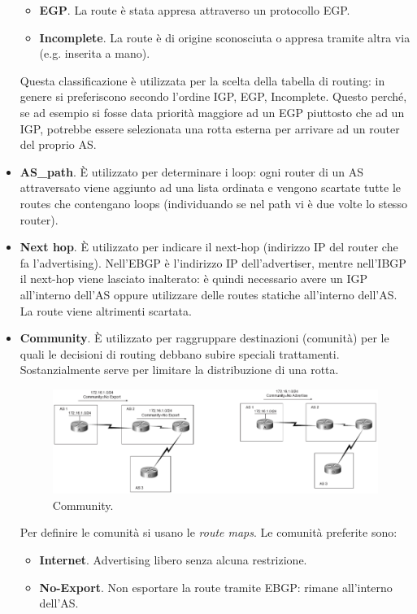 \begin{itemize}
\begin{itemize}
		\item \textbf{EGP}. La route è stata appresa attraverso un protocollo EGP.
		\item \textbf{Incomplete}. La route è di origine sconosciuta o appresa tramite altra via (e.g. inserita a mano).
	\end{itemize}
	Questa classificazione è utilizzata per la scelta della tabella di routing: in genere si preferiscono secondo l'ordine IGP, EGP, Incomplete. Questo perché, se ad esempio si fosse data priorità maggiore ad un EGP piuttosto che ad un IGP, potrebbe essere selezionata una rotta esterna per arrivare ad un router del proprio AS.
	\item \textbf{AS\_path}. È utilizzato per determinare i loop: ogni router di un AS attraversato viene aggiunto ad una lista ordinata e vengono scartate tutte le routes che contengano loops (individuando se nel path vi è due volte lo stesso router).
	\item \textbf{Next hop}. È utilizzato per indicare il next-hop (indirizzo IP del router che fa l'advertising). Nell'EBGP è l'indirizzo IP dell'advertiser, mentre nell'IBGP il next-hop viene lasciato inalterato: è quindi necessario avere un IGP all'interno dell'AS oppure utilizzare delle routes statiche all'interno dell'AS. La route viene altrimenti scartata.
	\item \textbf{Community}. È utilizzato per raggruppare destinazioni (comunità) per le quali le decisioni di routing debbano subire speciali trattamenti. Sostanzialmente serve per limitare la distribuzione di una rotta.
	\begin{figure}[htbp]
		\centering
		\includegraphics[scale = 0.5]{images/community}
		\caption{Community.}
		\label{img:community}
	\end{figure}
	Per definire le comunità si usano le \textit{route maps}. Le comunità preferite sono:
	\begin{itemize}
		\item \textbf{Internet}. Advertising libero senza alcuna restrizione.
		\item \textbf{No-Export}. Non esportare la route tramite EBGP: rimane all'interno dell'AS.

\end{itemize}
\end{itemize}
